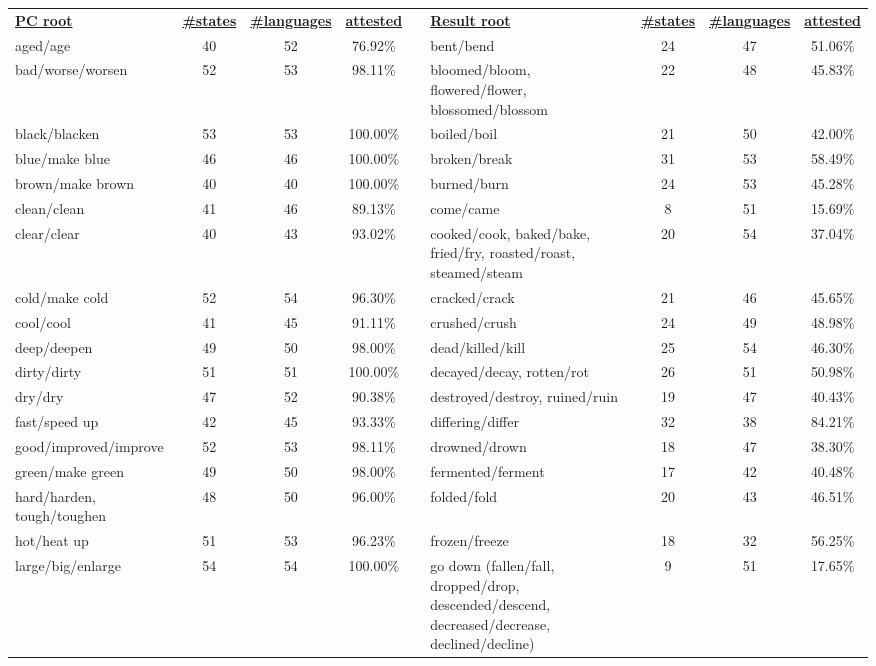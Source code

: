 \begin{tabular}{p{3cm}ccccp{3cm}ccc}
\underline{\textbf{PC root}} & \underline{\textbf{\#states}} & \underline{\textbf{\#languages}} & \underline{\textbf{attested}} & & \underline{\textbf{Result root}} & \underline{\textbf{\#states}} & \underline{\textbf{\#languages}} & \underline{\textbf{attested}} \\
aged/age & 40 & 52 & 76.92\% & & bent/bend & 24 & 47 & 51.06\% \\
bad/worse/worsen & 52 & 53 & 98.11\% & & bloomed/bloom, flowered/flower, blossomed/blossom & 22 & 48 & 45.83\% \\
black/blacken & 53 & 53 & 100.00\% & & boiled/boil & 21 & 50 & 42.00\% \\
blue/make blue & 46 & 46 & 100.00\% & & broken/break & 31 & 53 & 58.49\% \\
brown/make brown & 40 & 40 & 100.00\% & & burned/burn & 24 & 53 & 45.28\% \\
clean/clean & 41 & 46 & 89.13\% & & come/came & 8 & 51 & 15.69\% \\
clear/clear & 40 & 43 & 93.02\% & & cooked/cook, baked/bake, fried/fry, roasted/roast, steamed/steam & 20 & 54 & 37.04\% \\
cold/make cold & 52 & 54 & 96.30\% & & cracked/crack & 21 & 46 & 45.65\% \\
cool/cool & 41 & 45 & 91.11\% & & crushed/crush & 24 & 49 & 48.98\% \\
deep/deepen & 49 & 50 & 98.00\% & & dead/killed/kill & 25 & 54 & 46.30\% \\
dirty/dirty & 51 & 51 & 100.00\% & & decayed/decay, rotten/rot & 26 & 51 & 50.98\% \\
dry/dry & 47 & 52 & 90.38\% & & destroyed/destroy, ruined/ruin & 19 & 47 & 40.43\% \\
fast/speed up & 42 & 45 & 93.33\% & & differing/differ & 32 & 38 & 84.21\% \\
good/improved/improve & 52 & 53 & 98.11\% & & drowned/drown & 18 & 47 & 38.30\% \\
green/make green & 49 & 50 & 98.00\% & & fermented/ferment & 17 & 42 & 40.48\% \\
hard/harden, tough/toughen & 48 & 50 & 96.00\% & & folded/fold & 20 & 43 & 46.51\% \\
hot/heat up & 51 & 53 & 96.23\% & & frozen/freeze & 18 & 32 & 56.25\% \\
large/big/enlarge & 54 & 54 & 100.00\% & & go down (fallen/fall, dropped/drop, descended/descend, decreased/decrease, declined/decline) & 9 & 51 & 17.65\% \\

\end{tabular}
